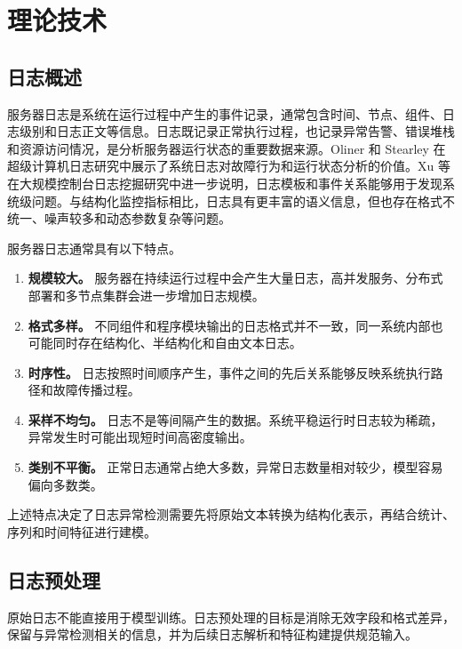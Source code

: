 \chapter{理论技术}
\vspace{7pt}

\section{日志概述}

服务器日志是系统在运行过程中产生的事件记录，通常包含时间、节点、组件、日志级别和日志正文等信息。日志既记录正常执行过程，也记录异常告警、错误堆栈和资源访问情况，是分析服务器运行状态的重要数据来源。Oliner 和 Stearley 在超级计算机日志研究中展示了系统日志对故障行为和运行状态分析的价值\cite{oliner2007supercomputers}。Xu 等在大规模控制台日志挖掘研究中进一步说明，日志模板和事件关系能够用于发现系统级问题\cite{xu2009detecting}。与结构化监控指标相比，日志具有更丰富的语义信息，但也存在格式不统一、噪声较多和动态参数复杂等问题。

服务器日志通常具有以下特点。

\begin{enumerate}
    \item \textbf{规模较大。} 服务器在持续运行过程中会产生大量日志，高并发服务、分布式部署和多节点集群会进一步增加日志规模。
    \item \textbf{格式多样。} 不同组件和程序模块输出的日志格式并不一致，同一系统内部也可能同时存在结构化、半结构化和自由文本日志。
    \item \textbf{时序性。} 日志按照时间顺序产生，事件之间的先后关系能够反映系统执行路径和故障传播过程。
    \item \textbf{采样不均匀。} 日志不是等间隔产生的数据。系统平稳运行时日志较为稀疏，异常发生时可能出现短时间高密度输出。
    \item \textbf{类别不平衡。} 正常日志通常占绝大多数，异常日志数量相对较少，模型容易偏向多数类。
\end{enumerate}

上述特点决定了日志异常检测需要先将原始文本转换为结构化表示，再结合统计、序列和时间特征进行建模。

\section{日志预处理}

原始日志不能直接用于模型训练。日志预处理的目标是消除无效字段和格式差异，保留与异常检测相关的信息，并为后续日志解析和特征构建提供规范输入。

